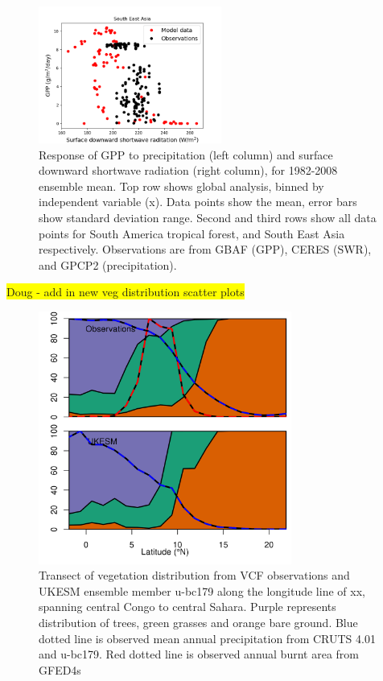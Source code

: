 \documentclass[bg, manuscript]{copernicus}
\newcommand{\hilight}[1]{\colorbox{yellow}{#1}}
\begin{document}
\begin{figure}[t]
    \includegraphics[width=6cm]{figs/GPPresponse/br.png}
    \caption{Response of GPP to precipitation (left column) and surface downward shortwave radiation (right column), for 1982-2008 ensemble mean. Top row shows global analysis, binned by independent variable (x). Data points show the mean, error bars show standard deviation range. Second and third rows show all data points for South America tropical forest, and South East Asia respectively. Observations are from GBAF (GPP), CERES (SWR), and GPCP2 (precipitation). \label{fig:GPPresponses}}
\end{figure}

\hilight{Doug - add in new veg distribution scatter plots}

\begin{figure}[t]
\includegraphics[width=8.3cm]{figs/trasect_AFRICA.png}
\caption{Transect of vegetation distribution from VCF observations and UKESM ensemble member u-bc179 along the longitude line of xx, spanning central Congo to central Sahara. Purple represents distribution of trees, green grasses and orange bare ground. Blue dotted line is observed mean annual precipitation from CRUTS 4.01 and u-bc179. Red dotted line is observed annual burnt area from GFED4s}
\end{figure}
\end{document}
